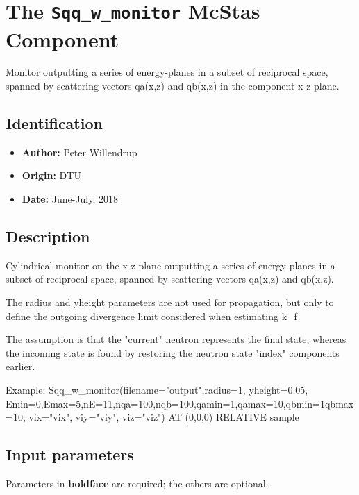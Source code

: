 \section{The \texttt{Sqq\_w\_monitor} McStas Component}
Monitor outputting a series of energy-planes in a subset of reciprocal space, spanned by
scattering vectors qa(x,z) and qb(x,z) in the component x-z plane.

\subsection*{Identification}
\begin{itemize}
  \item \textbf{Author:} Peter Willendrup
  \item \textbf{Origin:} DTU
  \item \textbf{Date:} June-July, 2018
\end{itemize}

\subsection*{Description}
Cylindrical monitor on the x-z plane outputting a series of energy-planes in a subset of reciprocal space, spanned by scattering vectors qa(x,z) and qb(x,z).

The radius and yheight parameters are not used for propagation, but only to define the outgoing divergence limit considered when estimating k\_f

The assumption is that the "current" neutron represents the final state, whereas the incoming state is found by restoring the neutron state "index" components earlier.

Example: Sqq\_w\_monitor(filename="output",radius=1, yheight=0.05, Emin=0,Emax=5,nE=11,nqa=100,nqb=100,qamin=1,qamax=10,qbmin=1qbmax=10, vix="vix", viy="viy", viz="viz") AT (0,0,0) RELATIVE sample

\subsection*{Input parameters}
Parameters in \textbf{boldface} are required; the others are optional.

